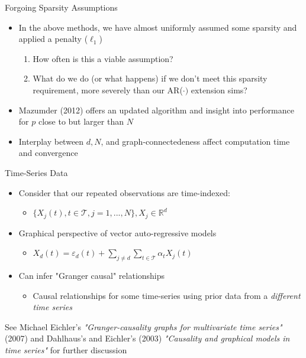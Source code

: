 \documentclass{beamer}
\begin{document}
    
\begin{frame}{Forgoing Sparsity Assumptions}
\begin{itemize}
\item In the above methods, we have almost uniformly assumed some sparsity and applied a penalty ($\ell_1$)
    \begin{enumerate}
        \item How often is this a viable assumption? 
        \item What do we do (or what happens) if we don't meet this sparsity requirement, more severely than our AR($\cdot)$ extension sims?  
    \end{enumerate}
\item     Mazumder (2012) \cite{mazumder_graphical_2012} offers an updated algorithm and insight into performance for $p$ close to but larger than $N$
\item Interplay between $d, N$, and graph-connectedeness affect computation time and convergence 
\end{itemize}
\end{frame}

\begin{frame}{Time-Series Data}

\begin{itemize} \setlength\itemsep{5mm}

    \item Consider that our repeated observations are time-indexed:
    \begin{itemize} 
        \item  $\{X_j(t), t \in \mathcal{T}, j=1, ..., N\}, X_j \in \mathbb{R}^d$ 
    \end{itemize}

    \item Graphical perspective of vector auto-regressive models
    \begin{itemize}
        \item $X_d(t) = \varepsilon_d(t) + \sum_{j\neq d}\sum_{t\in\mathcal{T}} \alpha_tX_j(t)$
    \end{itemize}


    \item Can infer "Granger causal" relationships
        \begin{itemize}
            \item Causal relationships for some time-series using prior data from a {\it different time series}
        \end{itemize}

\end{itemize}

See Michael Eichler's {\it "Granger-causality graphs for multivariate time series"} (2007) and Dahlhaus's and Eichler's (2003) {\it "Causality and graphical models in time series"} for further discussion  

\end{frame}
\end{document}
